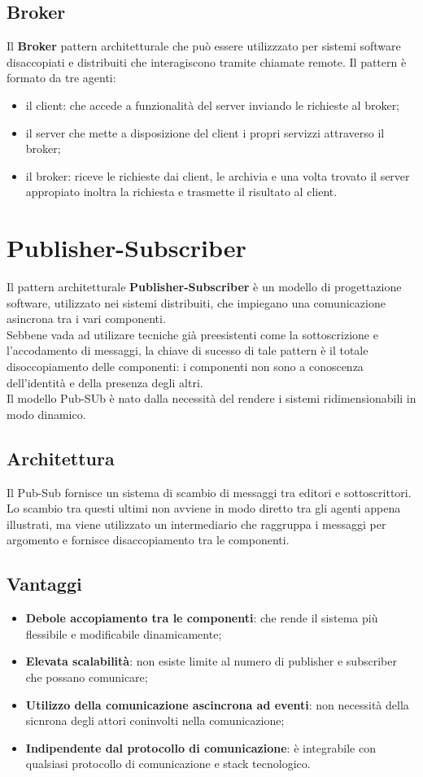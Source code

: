\documentclass{article}
\begin{document}
\subsection{Broker}
Il \textbf{Broker} pattern architetturale che può essere utilizzzato per sistemi software disaccopiati e distribuiti che interagiscono tramite chiamate remote.
Il pattern è formato da tre agenti:
\begin{itemize}
    \item il client: che accede a funzionalità del server inviando le richieste al broker;
    \item il server che mette a disposizione del client i propri servizzi attraverso il broker;
    \item il broker: riceve le richieste dai client, le archivia e una volta trovato il server appropiato inoltra la richiesta e trasmette il risultato al client.
\end{itemize}
\section{Publisher-Subscriber}
Il pattern architetturale \textbf{Publisher-Subscriber} è un modello di progettazione software, utilizzato nei sistemi distribuiti, che impiegano una comunicazione asincrona tra i vari componenti.\\
Sebbene vada ad utilizare tecniche già preesistenti come la sottoscrizione e l'accodamento di messaggi, la  chiave di sucesso di tale pattern è il totale disoccopiamento delle componenti: i componenti non sono a conoscenza dell'identità e della presenza degli altri.\\
Il modello Pub-SUb è nato dalla necessità del rendere i sistemi ridimensionabili in modo dinamico.
\subsection{Architettura}
Il Pub-Sub fornisce un sistema di scambio di messaggi tra editori e sottoscrittori. Lo scambio tra questi ultimi non avviene in modo diretto tra gli agenti appena illustrati, ma viene utilizzato un intermediario che raggruppa i messaggi per argomento e fornisce disaccopiamento tra le componenti.
\subsection{Vantaggi}
\begin{itemize}
    \item \textbf{Debole accopiamento tra le componenti}: che rende il sistema più flessibile e modificabile dinamicamente;
    \item \textbf{Elevata scalabilità}: non esiste limite al numero di publisher e subscriber che possano comunicare;
    \item \textbf{Utilizzo della comunicazione ascincrona ad eventi}: non necessità della sicnrona degli attori coninvolti nella comunicazione;
    \item \textbf{Indipendente dal protocollo di comunicazione}: è integrabile con qualsiasi protocollo di comunicazione e stack tecnologico.
\end{itemize}
\end{document}
